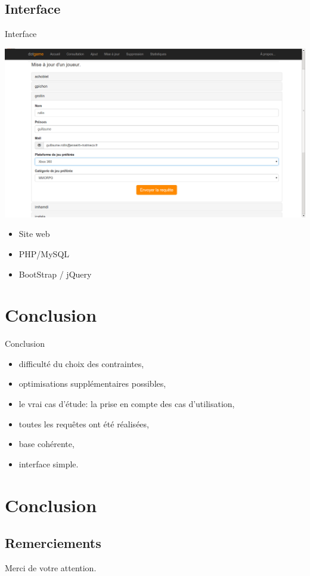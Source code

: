 \documentclass{beamer}
\begin{document}
\subsection{Interface}
\begin{frame}
\begin{block}{Interface}
\begin{center}
\includegraphics[scale=0.20]{capture2.png}
\end{center}
\begin{itemize}
\item Site web
\item PHP/MySQL
\item BootStrap / jQuery
\end{itemize}
\end{block}
\end{frame}

\section*{Conclusion}
\begin{frame}
\begin{block}{Conclusion}
\begin{itemize}

\item{difficulté du choix des contraintes,}
\item{optimisations supplémentaires possibles,}
\item{le vrai cas d'étude: la prise en compte des cas d'utilisation,}

\item{toutes les requêtes ont été réalisées,}
\item{base cohérente,}
\item{interface simple.}

\end{itemize}
\end{block}
\end{frame}


\section{Conclusion}
\subsection{Remerciements}
\begin{frame}
  \begin{center}
    \large{Merci de votre attention.}
  \end{center}
  \end{frame}
\end{document}
